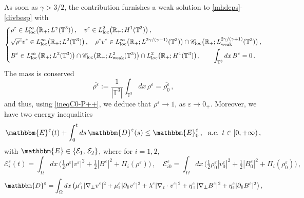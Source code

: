 \documentclass[11pt,reqno]{amsart}
\def \R{{\mathbb{R}}}
\def \T{{\mathbb{T}}}
\newcommand{\myparallel}{{\mkern3mu\vphantom{\perp}\vrule depth 0pt\mkern2mu\vrule depth 0pt\mkern3mu}}
\begin{document}
As soon as $\gamma>3/2$, the contribution  \cite{HW10} furnishes a  weak solution to \eqref{mhdeps}-\eqref{divbesp} with
\begin{equation}
  \label{reg-ws-mhdeps-P}
  \left\{
  \begin{aligned}
    &\rho^\varepsilon \in L_{\rm loc}^\infty \bigl(\R_+; L^\gamma(\T^3)\bigr)\,, \quad  v^\varepsilon \in   L_{\rm loc}^2\bigl(\R_+; H^1(\T^3)\bigr)\,, \\
    & \sqrt{\rho^\varepsilon}v^\varepsilon \in  L_{\rm loc}^\infty\bigl(\R_+; L^2(\T^3)\bigr)\,, \quad \rho^\varepsilon v^\varepsilon
    \in  L_{\rm loc}^\infty\bigl(\R_+; L^{2\gamma/(\gamma+1)}(\T^3)\big) \cap\mathscr{C}_{\rm loc}\big(\R_+; L_{\rm weak}^{2\gamma/(\gamma+1)}(\T^3)\big) \,,\\
    & B^\varepsilon \in L_{\rm loc}^\infty\bigl(\R_+; L^2(\T^3)\bigr) \cap  \mathscr{ C}_{\rm loc}\bigl(\R_+; L_{\rm weak}^2(\T^3)\bigr)  \cap  L_{\rm loc}^2\bigl(\R_+; H^1(\T^3)\bigr)\,, \qquad  \int_{\T^3} dx \, B^\varepsilon=0 \,.
  \end{aligned}
  \right.
\end{equation}
The mass is conserved
\[
\overline{\rho^\varepsilon} := \frac{1}{|\T^3|} \int_{\T^3} dx\,\rho^\varepsilon  = \overline{\rho_0^\varepsilon} \,,
\]
and thus, using \eqref{ineqC0-P++}, we deduce that  $\overline{\rho^\varepsilon} \rightarrow 1$, as $\varepsilon \rightarrow 0_+$. Moreover, we have two  energy inequalities
\begin{equation}
\label{nrj-ineq-mhdeps}
\mathbbm{E}^\varepsilon(t) + \int_0^t ds \, \mathbbm{D}^\varepsilon(s) \leq  \mathbbm{E}_0^\varepsilon\,, \ \mbox{ a.e. } t \in [0,+\infty)\,,
\end{equation}
with $ \mathbbm{E} \in \{\mathcal{E}_1,\,\mathcal{E}_2\}$, where for $i=1,2$, 
\begin{equation}
\label{nrj-def}
\mathcal{E}_i^\varepsilon(t)=
\int_{\Omega} dx\, \Big( \tfrac 12 \rho^\varepsilon |v^\varepsilon|^2 + \tfrac 12 |B^\varepsilon|^2 + \Pi_i(\rho^\varepsilon)\Big)\,,
\quad
\mathcal{E}_{i0}^\varepsilon=
 \int_{\Omega} dx\, \Big( \tfrac 12\rho_0^\varepsilon |v_0^\varepsilon|^2 + \tfrac 12|B_0^\varepsilon|^2 + \Pi_i(\rho_0^\varepsilon) \Big)\,, 
\end{equation}
\begin{equation}
\label{dissip-D}
 \mathbbm{D}^\varepsilon=
\int_{\Omega} dx\, \big( \mu_\perp^\varepsilon |\nabla_\perp v^\varepsilon|^2 + \mu_\myparallel^\varepsilon |\partial_\myparallel v^\varepsilon|^2 +
\lambda^\varepsilon  |\nabla_\varepsilon \cdot v^\varepsilon|^2 +
\eta_\perp^\varepsilon |\nabla_\perp B^\varepsilon|^2 + \eta_\myparallel^\varepsilon |\partial_\myparallel B^\varepsilon|^2
\big)\,, 
\end{equation}
\end{document}
